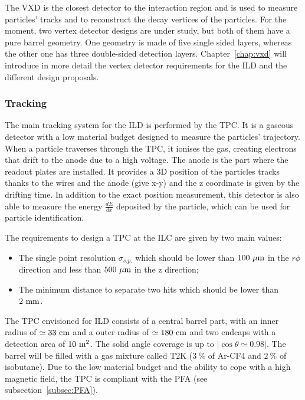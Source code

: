       The \gls{VXD} is the closest detector to the interaction region and is used to measure particles' tracks and to reconstruct the decay vertices of the particles.
      For the moment, two vertex detector designs are under study, but both of them have a pure barrel geometry.
      One geometry is made of five single sided layers, whereas the other one has three double-sided detection layers.
      Chapter~\ref{chap:vxd} will introduce in more detail the vertex detector requirements for the \gls{ILD} and the different design proposals.

      \subsubsection{Tracking}

      The main tracking system for the \gls{ILD} is performed by the \gls{TPC}.
      It is a gaseous detector with a low material budget designed to measure the particles' trajectory.
      When a particle traverses through the \gls{TPC}, it ionises the gas, creating electrons that drift to the anode due to a high voltage.
      The anode is the part where the readout plates are installed.
      It provides a 3D position of the particles tracks thanks to the wires and the anode (give x-y) and the z coordinate is given by the drifting time.
      In addition to the exact position measurement, this detector is also able to measure the energy $\frac{dE}{dx}$ deposited by the particle, which can be used for particle identification.

      The requirements to design a \gls{TPC} at the \gls{ILC} are given by two main values: 
      
      \begin{itemize} 
        \item The single point resolution $\sigma_{s.p.}$ which should be lower than $100~\rm{\mu m}$ in the $r\phi$ direction and less than $500~\rm{\mu m}$ in the z direction;
        \item The minimum distance to separate two hits which should be lower than $2~\rm{mm}$.
      \end{itemize}

      The \gls{TPC} envisioned for \gls{ILD} consists of a central barrel part, with an inner radius of $\simeq 33~\rm{cm}$ and a outer radius of $\simeq 180~\rm{cm}$ and two endcaps with a detection area of $10~\rm{m^2}$. 
      The solid angle coverage is up to $|\cos{\theta} \simeq 0.98|$.
      The barrel will be filled with a gas mixture called T2K ($3~\%$ of Ar-CF4 and $2~\%$ of isobutane).
      Due to the low material budget and the ability to cope with a high magnetic field, the \gls{TPC} is compliant with the \gls{PFA} (see subsection~\ref{subsec:PFA}). 


